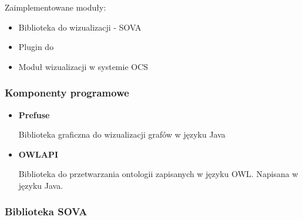 \documentclass{beamer}
\begin{document}
\begin{frame}
 \frametitle{}
Zaimplementowane moduły: 
\begin{itemize}
  \item Biblioteka do wizualizacji - SOVA
  \item Plugin do \protege
  \item Moduł wizualizacji w systemie OCS
\end{itemize}

\end{frame}

\begin{frame}
 \frametitle{Komponenty programowe}
  \begin{itemize}
   \item{\bf Prefuse }

Biblioteka graficzna do wizualizacji grafów w języku Java

\item{\bf OWLAPI}

      Biblioteka do przetwarzania ontologii zapisanych w języku OWL. Napisana w języku Java.

  \end{itemize}

\end{frame}

\begin{frame}
 \frametitle{Biblioteka SOVA}
\begin{center}
\end{center}

\end{frame}
\end{document}
